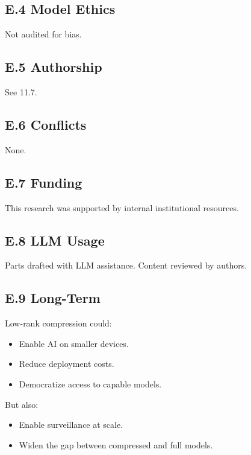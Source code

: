 \subsection{E.4 Model Ethics}

Not audited for bias.

\subsection{E.5 Authorship}

See  11.7.

\subsection{E.6 Conflicts}

None.

\subsection{E.7 Funding}

This research was supported by internal institutional resources.

\subsection{E.8 LLM Usage}

Parts drafted with LLM assistance. Content reviewed by authors.

\subsection{E.9 Long-Term}

Low-rank compression could:
\begin{itemize}
\item Enable AI on smaller devices.
\item Reduce deployment costs.
\item Democratize access to capable models.

\end{itemize}
But also:
\begin{itemize}
\item Enable surveillance at scale.
\item Widen the gap between compressed and full models.

\end{itemize}
